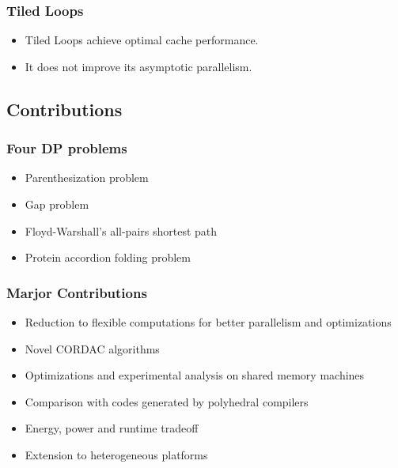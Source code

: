 \begin{frame}
    \frametitle{Tiled Loops}
	\begin{itemize}
		\item Tiled Loops achieve optimal cache performance.
		\item It does not improve its asymptotic parallelism.
	\end{itemize}
\end{frame}

\subsection{Contributions}
\begin{frame}
    \frametitle{Four DP problems}
	\begin{itemize}
		\item Parenthesization problem
		\item Gap problem
		\item Floyd-Warshall's all-pairs shortest path
		\item Protein accordion folding problem
	\end{itemize}
\end{frame}

\begin{frame}
    \frametitle{Marjor Contributions}
	\begin{itemize}
		\item Reduction to flexible computations for better parallelism
			and optimizations
		\item Novel CORDAC algorithms
		\item Optimizations and experimental analysis on shared memory machines
		\item Comparison with codes generated by polyhedral compilers
		\item Energy, power and runtime tradeoff
		\item Extension to heterogeneous platforms
	\end{itemize}
\end{frame}
